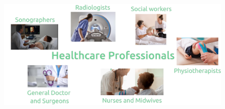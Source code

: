 
{
\begin{frame}{}

  \begin{figure}
  \centering
  \includegraphics[width=1.0\textwidth]{./../figures/healthcare-professionals/versions/drawing-v03}
  \end{figure}

\end{frame}
}


%
%


